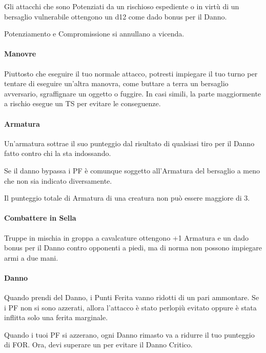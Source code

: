 \documentclass[itdr]{subfiles}
\begin{document}
Gli attacchi che sono Potenziati da un rischioso espediente o in virtù di un bersaglio vulnerabile ottengono un d12 come dado bonus per il Danno.

Potenziamento e Compromissione si annullano a vicenda.

\vfill
\paragraph{Manovre}
Piuttosto che eseguire il tuo normale attacco, potresti impiegare il tuo turno per tentare di eseguire un’altra manovra, come buttare a terra un bersaglio avversario, sgraffignare un oggetto o fuggire. In casi simili, la parte maggiormente a rischio esegue un TS per evitare le conseguenze.

\vfill
\paragraph{Armatura}
Un’armatura sottrae il suo punteggio dal risultato di qualsiasi tiro per il Danno fatto contro chi la sta indossando. 

Se il danno bypassa i PF è comunque soggetto all’Armatura del bersaglio a meno che non sia indicato diversamente. 

Il punteggio totale di Armatura di una creatura non può essere maggiore di 3.

\vfill
\paragraph{Combattere in Sella}

Truppe in mischia in groppa a cavalcature ottengono +1 Armatura e un dado bonus per il Danno contro opponenti a piedi, ma di norma non possono impiegare armi a due mani.

\vfill
\paragraph{Danno}
Quando prendi del Danno, i Punti Ferita vanno ridotti di un pari ammontare. Se i PF non si sono azzerati, allora l’attacco è stato perlopiù evitato oppure è stata inflitta solo una ferita marginale.

Quando i tuoi PF si azzerano, ogni Danno rimasto va a ridurre il tuo punteggio di FOR. Ora, devi superare un  per evitare il Danno Critico.
\end{document}
